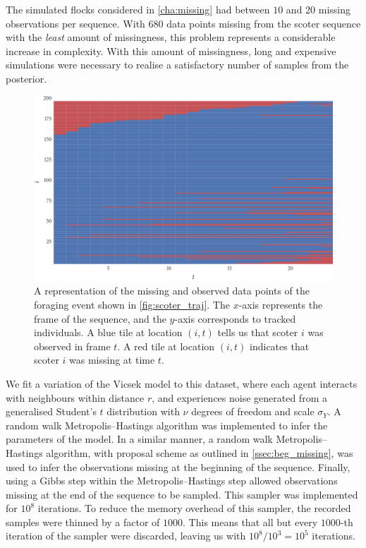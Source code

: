 The simulated flocks considered in \cref{cha:missing} had between $10$ and $20$
missing observations per sequence. With $680$ data points missing from the
scoter sequence with the \emph{least} amount of missingness, this problem
represents a considerable increase in complexity. With this amount of
missingness, long and expensive simulations were necessary to realise a
satisfactory number of samples from the posterior.

\begin{figure}[tb]
  \includegraphics{data_00_missing.pdf}
  \caption{A representation of the missing and observed data points of the
    foraging event shown in \cref{fig:scoter_traj}. The $x$-axis represents the
    frame of the sequence, and the $y$-axis corresponds to tracked individuals. A
    blue tile at location $(i,t)$ tells us that scoter $i$ was observed in frame
    $t$. A red tile at location $(i,t)$ indicates that scoter $i$ was missing at
    time $t$.}
  \label{fig:scoter_missing}
\end{figure}

We fit a variation of the Vicsek model to this dataset, where each agent
interacts with neighbours within distance $r$, and experiences noise generated
from a generalised Student's $t$ distribution with $\nu$ degrees of freedom and
scale $\sigma_Y$. A random walk Metropolis--Hastings algorithm was implemented
to infer the parameters of the model. In a similar manner, a random walk
Metropolis--Hastings algorithm, with proposal scheme as outlined in
\cref{ssec:beg_missing}, was used to infer the observations missing at the
beginning of the sequence. Finally, using a Gibbs step within the
Metropolis--Hastings step allowed observations missing at the end of the
sequence to be sampled. This sampler was implemented for $10^8$ iterations. To
reduce the memory overhead of this sampler, the recorded samples were thinned
by a factor of $1000$. This means that all but every $1000$-th iteration of the
sampler were discarded, leaving us with $10^8 / 10^3 = 10^5$ iterations.

